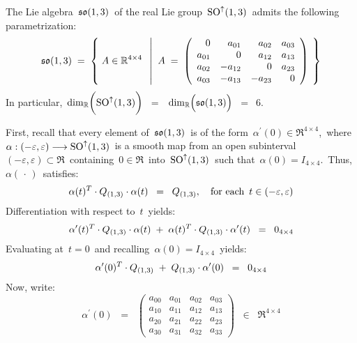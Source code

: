 \vskip 0.5cm
\begin{proposition}[Parametrization of \,$\so(1,3)$]
\mbox{}
\vskip 0.1cm
\noindent
The Lie algebra \,$\so(1,3)$\, of the real Lie group \,$\textnormal{SO}^{\uparrow}(1,3)$\,
admits the following parametrization:
\begin{equation*}
\so{(1,3)}
\; = \;
	\left\{\;
		A
		\overset{{\color{white}.}}{\in}
		\Re^{4 \times 4}
		\;\;\left\vert\;\;
			A \;=\;
			\left(\begin{array}{rrrr}
			        0 &   a_{01} &  a_{02} & a_{03} \\
			a_{01} &           0 &  a_{12} & a_{13} \\
			a_{02} & -a_{12} &           0 & a_{23} \\
			a_{03} & -a_{13} & -a_{23} &          0 \\
			\end{array}\right)
			\right.
		\;\right\}
\end{equation*}
In particular,
\,$\dim_{\Re}\!\left(\overset{{\color{white}.}}{\SO^{\uparrow}(1,3)}\right)$
\,$=$\,
\,$\dim_{\Re}\!\left(\overset{{\color{white}.}}{\so(1,3)}\right)$
\,$=$\, $6$.\,
\end{proposition}
\proof
First, recall that every element of \,$\so(1,3)$\, is of the form \,$\alpha^{\prime}(0) \in \Re^{4 \times 4}$,\,
where
\,$\alpha : (-\varepsilon,\varepsilon) \longrightarrow \textnormal{SO}^{\uparrow}(1,3)$\,
is a smooth map from an open subinterval \,$(-\varepsilon,\varepsilon) \subset \Re$\,
containing \,$0 \in \Re$\, into
\,$\textnormal{SO}^{\uparrow}(1,3)$\,
such that
\,$\alpha(0) = I_{4 \times 4}$.\,
Thus, \,$\alpha(\,\cdot\,)$\, satisfies:
\begin{equation*}
\alpha(t)^{T} \cdot Q_{(1,3)} \cdot \alpha(t) \;\; = \;\; Q_{(1,3)},
\quad
\textnormal{for each \,$t \in (-\varepsilon,\varepsilon)$}
\end{equation*}
Differentiation with respect to \,$t$\, yields:
\begin{equation*}
\alpha^{\prime}(t)^{T} \cdot Q_{(1,3)} \cdot \alpha(t) \;+\; \alpha(t)^{T} \cdot Q_{(1,3)} \cdot \alpha^{\prime}(t) \;\; = \;\; 0_{4 \times 4}
\end{equation*}
Evaluating at \,$t = 0$\, and recalling \,$\alpha(0) = I_{4 \times 4}$\, yields:
\begin{equation*}
\alpha^{\prime}(0)^{T} \cdot Q_{(1,3)} \;+\; Q_{(1,3)} \cdot \alpha^{\prime}(0) \;\; = \;\; 0_{4 \times 4}
\end{equation*}
Now, write:
\begin{equation*}
\alpha^{\prime}(0)
\;\; = \;\;
	\left(\begin{array}{cccc}
	a_{00} & a_{01} & a_{02} & a_{03}
	\\
	a_{10} & a_{11} & a_{12} & a_{13}
	\\
	a_{20} & a_{21} & a_{22} & a_{23}
	\\
	a_{30} & a_{31} & a_{32} & a_{33}
	\end{array}\right)
\;\; \in \;\;
	\Re^{4 \times 4}
\end{equation*}
